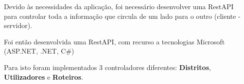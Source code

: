 Devido às necessidades da aplicação, foi necessário desenvolver uma RestAPI para controlar toda a informação que circula de um lado para o outro (cliente - servidor).

Foi então desenvolvida uma RestAPI, com recurso a tecnologias Microsoft (ASP.NET, .NET, C\#)

Para isto foram implementados 3 controladores diferentes: \textbf{Distritos}, \textbf{Utilizadores} e \textbf{Roteiros}.